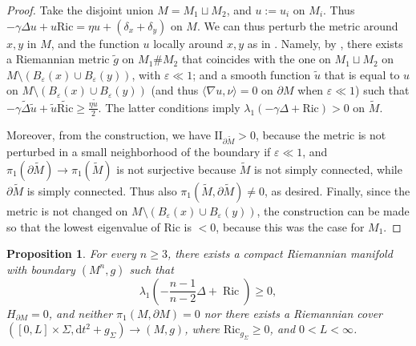 \documentclass[12pt,a4paper,reqno]{amsart}
\newtheorem{proposition}{Proposition}
\theoremstyle{definition}
\renewcommand{\geq}{\geqslant}
\DeclareMathOperator{\Ric}{Ric}
\renewcommand{\tilde}{\widetilde}
\begin{document}
{\begin{proof}
        Take the disjoint union $M=M_1\sqcup M_2$, and $u:=u_i$ on $M_i$. Thus $-\gamma\Delta u+u\mathrm{Ric}=\eta u + (\delta_x+\delta_y)$ on $M$. We can thus perturb the metric around $x,y$ in $M$, and the function $u$ locally around $x,y$ as in \cite{AX25}. Namely, by \cite[Proposition 1]{AX25}, there exists a Riemannian metric $\tilde g$ on $M_1\# M_2$ that coincides with the one on $M_1\sqcup M_2$ on $M\setminus(B_\varepsilon(x)\cup B_\varepsilon(y))$, with $\varepsilon\ll 1$; and a smooth function $\tilde u$ that is equal to $u$ on $M\setminus(B_\varepsilon(x)\cup B_\varepsilon(y))$ (and thus $\langle\nabla u,\nu\rangle=0$ on $\partial M$ when $\varepsilon\ll 1$) such that $-\gamma\widetilde\Delta \tilde u + \widetilde u\widetilde{\mathrm{Ric}}\geq \frac{\eta\widetilde u}{2}$. The latter conditions imply $\lambda_1(-\gamma\Delta+\mathrm{Ric})>0$ on $\tilde M$. 
        
        Moreover, from the construction, we have $\mathrm{II}_{\partial\tilde M}>0$, because the metric is not perturbed in a small neighborhood of the boundary if $\varepsilon\ll 1$, and $\pi_1(\partial\tilde M)\to \pi_1(\tilde M)$ is not surjective because $\tilde M$ is not simply connected, while $\partial\tilde M$ is simply connected. Thus also $\pi_1(\tilde M,\partial\tilde M)\neq 0$, as desired. Finally, since the metric is not changed on $M\setminus(B_\varepsilon(x)\cup B_\varepsilon(y))$, the construction can be made so that the lowest eigenvalue of $\mathrm{Ric}$ is $<0$, because this was the case for $M_1$.
    \end{proof}

\begin{proposition}\label{eqn:Counterexample2}
For every \(n\geq 3\), there exists a compact Riemannian manifold with boundary \((M^n,g)\) such that
\begin{equation}\label{eqn:Lambda1Counter}
\lambda_1\left(-\frac{n-1}{n-2}\Delta+\Ric\right) \geq 0,
\end{equation}
\(H_{\partial M}=0\), and neither \(\pi_1(M,\partial M)=0\) nor there exists a Riemannian cover $([0,L]\times\Sigma,\mathrm{d}t^2+g_\Sigma)\to (M,g)$, where $\mathrm{Ric}_{g_\Sigma}\geq 0$, and $0<L<\infty$.
\end{proposition}

}
\end{document}
